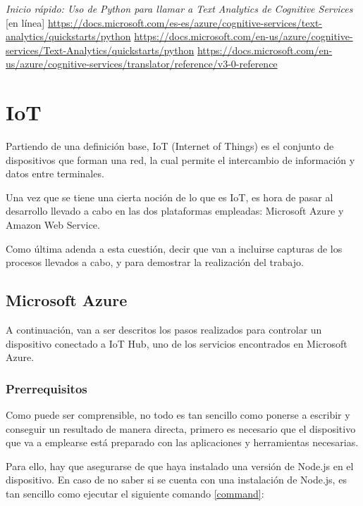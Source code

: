 \documentclass[english,runningheads,a4paper]{llncs}[2018/03/10]
\begin{document}
\begin{thebibliography}{8}
        \textit{Inicio rápido: Uso de Python para llamar a Text Analytics de Cognitive Services} [en línea] \url{https://docs.microsoft.com/es-es/azure/cognitive-services/text-analytics/quickstarts/python}
        \url{https://docs.microsoft.com/en-us/azure/cognitive-services/Text-Analytics/quickstarts/python}
        \url{https://docs.microsoft.com/en-us/azure/cognitive-services/translator/reference/v3-0-reference}
        
    \end{thebibliography}

\section{IoT}

Partiendo de una definición base, IoT (Internet of Things) es el conjunto de
dispositivos que forman una red, la cual permite el intercambio de información y
datos entre terminales.

Una vez que se tiene una cierta noción de lo que es IoT, es hora de pasar al
desarrollo llevado a cabo en las dos plataformas empleadas: Microsoft Azure y
Amazon Web Service.

Como última adenda a esta cuestión, decir que van a incluirse capturas de los
procesos llevados a cabo, y para demostrar la realización del trabajo.

\subsection*{Microsoft Azure}

A continuación, van a ser descritos los pasos realizados para controlar un
dispositivo conectado a IoT Hub, uno de los servicios encontrados en Microsoft
Azure.

\subsubsection{Prerrequisitos}

Como puede ser comprensible, no todo es tan sencillo como ponerse a escribir y
conseguir un resultado de manera directa, primero es necesario que el
dispositivo que va a emplearse está preparado con las aplicaciones y
herramientas necesarias.

Para ello, hay que asegurarse de que haya instalado una versión de Node.js en el
dispositivo. En caso de no saber si se cuenta con una instalación de Node.js, es
 tan sencillo como ejecutar el siguiente comando
 \hyperref[command]{\ref{command}}:
\end{document}
